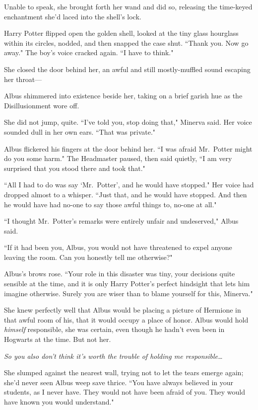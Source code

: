 Unable to speak, she brought forth her wand and did so, releasing the time-keyed enchantment she'd laced into the shell's lock.

Harry Potter flipped open the golden shell, looked at the tiny glass hourglass within its circles, nodded, and then snapped the case shut. ``Thank you. Now go away." The boy's voice cracked again. ``I have to think."

\later

She closed the door behind her, an awful and still mostly-muffled sound escaping her throat—

Albus shimmered into existence beside her, taking on a brief garish hue as the Disillusionment wore off.

She did not jump, quite. ``I've told you, stop doing that," Minerva said. Her voice sounded dull in her own ears. ``That was private."

Albus flickered his fingers at the door behind her. ``I was afraid Mr.~Potter might do you some harm." The Headmaster paused, then said quietly, ``I am very surprised that you stood there and took that."

``All I had to do was say `Mr.~Potter', and he would have stopped." Her voice had dropped almost to a whisper. ``Just that, and he would have stopped. And then he would have had no-one to say those awful things to, no-one at all."

``I thought Mr.~Potter's remarks were entirely unfair and undeserved," Albus said.

``If it had been you, Albus, you would not have threatened to expel anyone leaving the room. Can you honestly tell me otherwise?"

Albus's brows rose. ``Your role in this disaster was tiny, your decisions quite sensible at the time, and it is only Harry Potter's perfect hindsight that lets him imagine otherwise. Surely you are wiser than to blame yourself for this, Minerva."

She knew perfectly well that Albus would be placing a picture of Hermione in that awful room of his, that it would occupy a place of honor. Albus would hold \emph{himself} responsible, she was certain, even though he hadn't even been in Hogwarts at the time. But not her.

\emph{So you also don't think it's worth the trouble of holding me responsible{\ldots}}

She slumped against the nearest wall, trying not to let the tears emerge again; she'd never seen Albus weep save thrice. ``You have always believed in your students, as I never have. They would not have been afraid of you. They would have known you would understand."

